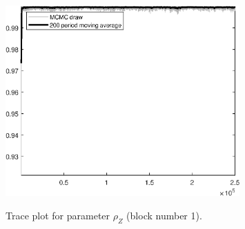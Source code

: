 \begin{figure}[H]
\centering
  \includegraphics[width=0.8\textwidth]{BRS_fd/graphs/TracePlot_rho_Z_blck_1}\\
    \caption{Trace plot for parameter ${\rho_Z}$ (block number 1).}
\end{figure}
